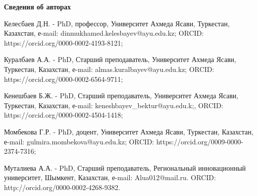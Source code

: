 {\bfseries Сведения об авторах}

Келесбаев Д.Н. - PhD, профессор, Университет Ахмеда Ясави, Туркестан,
Казахстан, е-mail: dinmukhamed.kelesbayev@ayu.edu.kz; ORCID:
https://orcid.org/0000-0002-4193-8121;

Куралбаев А.А. - PhD, Старший преподаватель, Университет Ахмеда Ясави,
Туркестан, Казахстан, е-mail: almas.kuralbayev@ayu.edu.kz; ORCID:
https://orcid.org/0000-0002-6564-9711;

Кенешбаев Б.Ж. - PhD, Старший преподаватель, Университет Ахмеда Ясави,
Туркестан, Казахстан, е-mail: keneshbayev\_bektur@ayu.edu.k;, ORCID:
https://orcid.org/0000-0002-4504-1418;

Момбекова Г.Р. - PhD, доцент, Университет Ахмеда Ясави, Туркестан,
Казахстан, е-mail: gulmira.mombekova@ayu.edu.kz; ORCID:
https://orcid.org/0009-0000-2374-7316;

Муталиева А.А. - PhD, Старший преподаватель, Региональный инновационный
университет, Шымкент, Казахстан, е-mail: Alua012@mail.ru. ORCID:
http://orcid.org/0000-0002-4268-9382.\